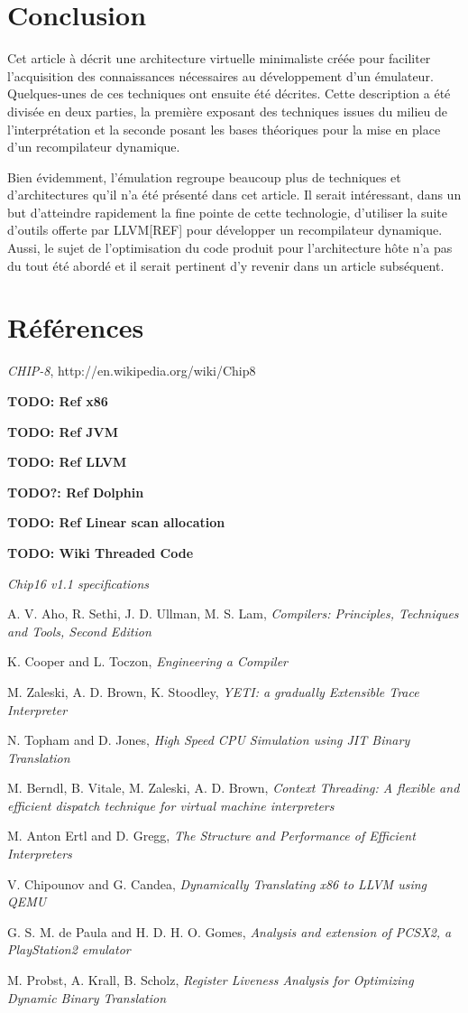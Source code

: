 \documentclass{article} %
\begin{document}
\section{Conclusion}
Cet article à décrit une architecture virtuelle minimaliste créée pour faciliter l'acquisition des connaissances nécessaires au développement d'un émulateur. Quelques-unes de ces techniques ont ensuite été décrites. Cette description a été divisée en deux parties, la première exposant des techniques issues du milieu de l'interprétation et la seconde posant les bases théoriques pour la mise en place d'un recompilateur dynamique.

Bien évidemment, l'émulation regroupe beaucoup plus de techniques et d'architectures qu'il n'a été présenté dans cet article. Il serait intéressant, dans un but d'atteindre rapidement la fine pointe de cette technologie, d'utiliser la suite d'outils offerte par LLVM[REF] pour développer un recompilateur dynamique. Aussi, le sujet de l'optimisation du code produit pour l'architecture hôte n'a pas du tout été abordé et il serait pertinent d'y revenir dans un article subséquent.

\section{Références}
\small{
\textit{CHIP-8}, http://en.wikipedia.org/wiki/Chip8

\textbf{TODO: Ref x86}

\textbf{TODO: Ref JVM}

\textbf{TODO: Ref LLVM}

\textbf{TODO?: Ref Dolphin}

\textbf{TODO: Ref Linear scan allocation}

\textbf{TODO: Wiki Threaded Code}

\textit{Chip16 v1.1 specifications}

A. V. Aho, R. Sethi, J. D. Ullman, M. S. Lam, \textit{Compilers: Principles, Techniques and Tools, Second Edition}

K. Cooper and L. Toczon, \textit{Engineering a Compiler}

M. Zaleski, A. D. Brown, K. Stoodley, \textit{YETI: a gradually Extensible Trace Interpreter}

N. Topham and D. Jones, \textit{High Speed CPU Simulation using JIT Binary Translation}

M. Berndl, B. Vitale, M. Zaleski, A. D. Brown, \textit{Context Threading: A flexible and efficient dispatch technique for virtual machine interpreters}

M. Anton Ertl and D. Gregg, \textit{The Structure and Performance of Efficient Interpreters}

V. Chipounov and G. Candea, \textit{Dynamically Translating x86 to LLVM using QEMU}

G. S. M. de Paula and H. D. H. O. Gomes, \textit{Analysis and extension of PCSX2, a PlayStation2 emulator}

M. Probst, A. Krall, B. Scholz, \textit{Register Liveness Analysis for Optimizing Dynamic Binary Translation}
}
\end{document}

